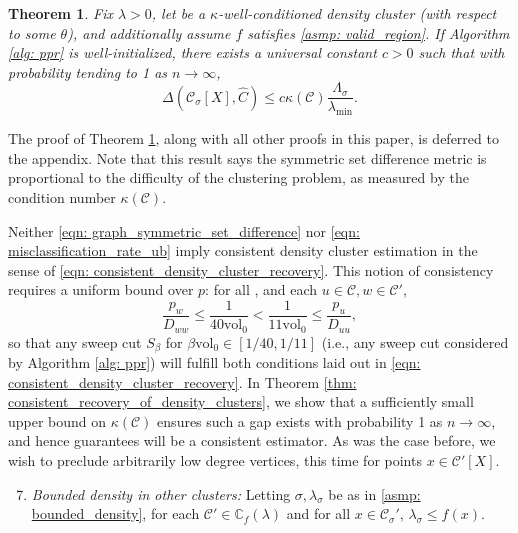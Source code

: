 \documentclass[11pt,twoside]{article}
\newtheorem{theorem}{Theorem}
\newcommand{\vol}{\mathrm{vol}}
\newcommand{\1}{\mathbf{1}}
\newcommand{\pbf}{p}        %
\newcommand{\Xbf}{X}             %
\newcommand{\Dbf}{D}
\newcommand{\Cbb}{\mathbb{C}}
\newcommand{\Cset}{\mathcal{C}}
\newcommand{\Csig}{\Cset_{\sigma}}
\newcommand{\Cest}{\widehat{C}}
\begin{document}
\begin{theorem}
  \label{thm: misclassification_rate}
  Fix $\lambda > 0$, let \smash{$\Cset \in \Cbb_f(\lambda)$} be a
  $\kappa$-well-conditioned density cluster (with respect to some $\theta$), and
  additionally assume $f$ satisfies \ref{asmp: valid_region}. If Algorithm
  \ref{alg: ppr} is well-initialized, there exists a universal constant $c >
  0$ such that with probability tending to 1 as $n \to \infty$,  
  \begin{equation}
    \label{eqn: misclassification_rate_ub}
    \Delta(\Csig[\Xbf], \Cest) \leq c \kappa(\Cset)
    \frac{\Lambda_{\sigma}}{\lambda_{\min}}. 
  \end{equation}
\end{theorem}

The proof of Theorem \ref{thm: misclassification_rate}, along with all other
proofs in this paper, is deferred to the appendix. Note that this 
result says the symmetric set difference metric \smash{$\Delta(\Csig[\Xbf],
  \Cest)$} is proportional to the difficulty of the clustering problem, as
measured by the condition number $\kappa(\Cset)$. 

Neither \eqref{eqn: graph_symmetric_set_difference} nor \eqref{eqn:
  misclassification_rate_ub} imply consistent density cluster estimation in the 
sense of \eqref{eqn: consistent_density_cluster_recovery}. This notion of
consistency requires a uniform bound over $\pbf$: for all \smash{$\Cset'
  \in \Cbb_f(\lambda), \Cset' \neq \Cset$}, and each $u \in \Cset, w \in
\Cset'$,  
\begin{equation}
\label{eqn: ppr_gap}
\frac{p_{w}}{\Dbf_{ww}} \leq \frac{1}{40\vol_0} < \frac{1}{11\vol_0} \leq
\frac{p_u}{\Dbf_{uu}}, 
\end{equation}
so that any sweep cut $S_{\beta}$ for $\beta \vol_0 \in [1/40,1/11]$ (i.e., any
sweep cut considered by Algorithm \ref{alg: ppr}) will fulfill both conditions
laid out in \eqref{eqn: consistent_density_cluster_recovery}. In Theorem
\ref{thm: consistent_recovery_of_density_clusters}, we show that a sufficiently
small upper bound on $\kappa(\Cset)$ ensures such a gap exists with probability
1 as $n \to \infty$, and hence guarantees \smash{$\Cest$} will be a consistent  
estimator. As was the case before, we wish to preclude arbitrarily low degree
vertices, this time for points $x \in \Cset'[\Xbf]$. 
\begin{enumerate}[label=(A\arabic*)]
  \setcounter{enumi}{6}
\item 
  \label{asmp: C'_bounded_density}
  \emph{Bounded density in other clusters:} Letting $\sigma,\lambda_{\sigma}$ be 
  as in \ref{asmp: bounded_density}, for each $\Cset' \in \Cbb_f(\lambda)$ and
  for all $x \in \Csig'$, $\lambda_{\sigma} \leq f(x)$. 
\end{enumerate}
\end{document}

